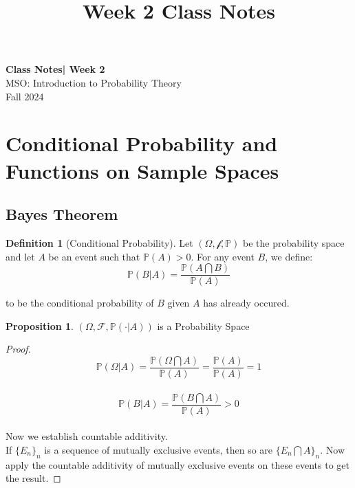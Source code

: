 \documentclass[11pt]{article}
\theoremstyle{definition}
\newtheorem{defn}{Definition}
\newtheorem{prop}{Proposition}[section]
\begin{document}
\setcounter{section}{1}
\title{Week 2 Class Notes}

\thispagestyle{empty}

\begin{center}
{\LARGE \bf Class Notes| Week 2}\\
{\large MSO: Introduction to Probability Theory}\\
Fall 2024
\end{center}

\tableofcontents

\section{Conditional Probability and Functions on Sample Spaces}

\subsection{Bayes Theorem}

\begin{defn}[Conditional Probability]
Let $(\Omega, \mathcal{f}, \mathbb{P})$ be the probability space and let $A$ be an event such that $\mathbb{P}(A) > 0$. For any event $B$, we define:
\begin{equation}
\mathbb{P}(B|A) = \frac{\mathbb{P}(A \bigcap B)}{\mathbb{P}(A)}
\end{equation}

to be the conditional probability of $B$ given $A$ has already occured. 

\end{defn}

\begin{prop}
$(\Omega, \mathcal{F}, \mathbb{P}(\cdotp | A))$ is a Probability Space
\end{prop}

\begin{proof}
$$
\mathbb{P}(\Omega|A) = \frac{\mathbb{P}(\Omega \bigcap A)}{\mathbb{P}(A)} = \frac{\mathbb{P}(A)}{\mathbb{P}(A)} = 1
$$
\\
$$
\mathbb{P}(B|A) = \frac{\mathbb{P}(B \bigcap A)}{\mathbb{P}(A)} > 0
$$
\\
Now we establish countable additivity.\\
If $\{E_n\}_n$ is a sequence of mutually exclusive events, then
so are $\{E_n \bigcap A\}_n$. Now apply the countable additivity of mutually exclusive events on these events to get the result.
\end{proof}
\end{document}
